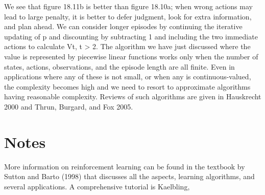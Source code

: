 We see that figure 18.11b is better than figure 18.10a; when wrong actions may lead to large penalty, it is better to defer judgment, look for extra information, and plan ahead. We can consider longer episodes by continuing the iterative updating of p and discounting by subtracting 1 and including the two immediate actions to calculate Vt, t > 2. The algorithm we have just discussed where the value is represented by piecewise linear functions works only when the number of states, actions, observations, and the episode length are all finite. Even in applications where any of these is not small, or when any is continuous-valued, the complexity becomes high and we need to resort to approximate algorithms having reasonable complexity. Reviews of such algorithms are given in Hauskrecht 2000 and Thrun, Burgard, and Fox 2005.

\section{Notes}

More information on reinforcement learning can be found in the textbook by Sutton and Barto (1998) that discusses all the aspects, learning algorithms, and several applications. A comprehensive tutorial is Kaelbling,

